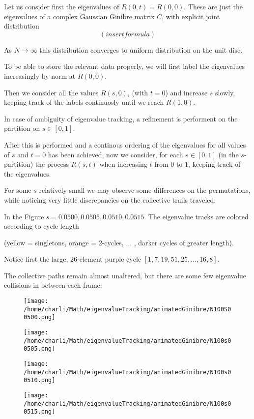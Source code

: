 \documentclass{article}
\begin{document}
	Let us consider first the eigenvalues of $R(0,t) = R(0,0)$. 
	These are just the eigenvalues of a complex Gaussian Ginibre matrix $C$,
	with explicit joint distribution 
	$$(insert formula)$$

	As $N\to \infty$ this distribution converges to uniform distribution on the unit disc.

	To be able to store the relevant data properly, 
	we will first label the eigenvalues increasingly by norm at $R(0,0)$. 
	
	Then we consider all the values $R(s,0)$, 
	(with $t = 0$) and increase $s$ slowly, keeping track of the labels continuosly 
	until we reach $R(1,0)$. 
	
	In case of ambiguity of eigenvalue tracking, a refinement is performent on 
	the partition on $s \in [0,1]$.

	After this is performed and a continous ordering of the eigenvalues for all values 
	of $s$ and $t=0$ has been achieved, now we consider, for each $s\in [0,1]$ 
	(in the $s$-partition) the process $R(s,t)$ when increasing $t$ from $0$ to $1$, 
	keeping track of the eigenvalues.

	For some $s$ relatively small we may observe some differences on the permutations, 
	while noticing very little discrepancies on the collective trails traveled.

	In the Figure $s=0.0500, 0.0505, 0.0510, 0.0515$. 
	The eigenvalue tracks are colored according to cycle length 
	
	(yellow = singletons, orange = 2-cycles, ... , darker cycles of greater length). 
	
	Notice first the large, $26$-element purple cycle $[1, 7, 19, 51, 25, \dots, 16, 8]$. 

	The collective paths remain almost unaltered, 
	but there are some few eigenvalue collisions in between each frame:
	
	\begin{figure}[ht]
		\centering
		\begin{minipage}{0.48\textwidth}
			\centering
			\texttt{[image: /home/charli/Math/eigenvalueTracking/animatedGinibre/N100S00500.png]}
		\end{minipage}
		\hfill
		\begin{minipage}{0.48\textwidth}
			\centering
			\texttt{[image: /home/charli/Math/eigenvalueTracking/animatedGinibre/N100s00505.png]}
		\end{minipage}
		\vspace{0.5em}
		\begin{minipage}{0.48\textwidth}
			\centering
			\texttt{[image: /home/charli/Math/eigenvalueTracking/animatedGinibre/N100s00510.png]}
		\end{minipage}
		\hfill
		\begin{minipage}{0.48\textwidth}
			\centering
			\texttt{[image: /home/charli/Math/eigenvalueTracking/animatedGinibre/N100s00515.png]}
		\end{minipage}
	\end{figure}
	
\end{document}
